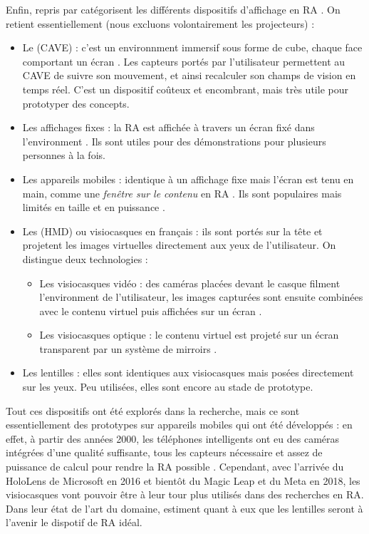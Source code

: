 Enfin, \cite{Buxton1998} repris par \cite{Bimber2005} catégorisent les différents dispositifs d'affichage en RA . On retient essentiellement (nous excluons volontairement les projecteurs) :
\begin{itemize}
  \item Le  (CAVE) : c'est un environnment immersif sous forme de cube, chaque face comportant un écran . Les capteurs portés par l'utilisateur permettent au CAVE de suivre son mouvement, et ainsi recalculer son champs de vision en temps réel. C'est un dispositif coûteux et encombrant, mais très utile pour prototyper des concepts.
  \item Les affichages fixes : la RA est affichée à travers un écran fixé dans l'environment . Ils sont utiles pour des démonstrations pour plusieurs personnes à la fois.
  \item Les appareils mobiles : identique à un affichage fixe mais l'écran est tenu en main, comme une \emph{fenêtre sur le contenu} en RA . Ils sont populaires mais limités en taille et en puissance \citep{Huang2013}.
  \item Les  (HMD) ou visiocasques en français : ils sont portés sur la tête et projetent les images virtuelles directement aux yeux de l'utilisateur. On distingue deux technologies :
  \begin{itemize}
    \item Les visiocasques vidéo : des caméras placées devant le casque filment l'environment de l'utilisateur, les images capturées sont ensuite combinées avec le contenu virtuel puis affichées sur un écran .
    \item Les visiocasques optique : le contenu virtuel est projeté sur un écran transparent par un système de mirroirs .
  \end{itemize}
  \item Les lentilles : elles sont identiques aux visiocasques mais posées directement sur les yeux. Peu utilisées, elles sont encore au stade de prototype.
\end{itemize}

Tout ces dispositifs ont été explorés dans la recherche, mais ce sont essentiellement des prototypes sur appareils mobiles qui ont été développés : en effet, à partir des années 2000, les téléphones intelligents ont eu des caméras intégrées d'une qualité suffisante, tous les capteurs nécessaire et assez de puissance de calcul pour rendre la RA possible \citep{Huang2013}. Cependant, avec l'arrivée du HoloLens de Microsoft en 2016 et bientôt du Magic Leap et du Meta en 2018, les visiocasques vont pouvoir être à leur tour plus utilisés dans des recherches en RA. Dans leur état de l'art du domaine, \cite{VanKrevelen2010} estiment quant à eux que les lentilles seront à l'avenir le dispotif de RA idéal.

